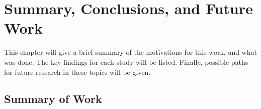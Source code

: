 \chapter{Summary, Conclusions, and Future Work}{
  \label{ch:Conclusions}
  This chapter will give a brief summary of the motivations for this work, and what was done.
  The key findings for each study will be listed.
  Finally, possible paths for future research in these topics will be given.

  \section{Summary of Work}{\label{sec:Summary of Work}
}}
